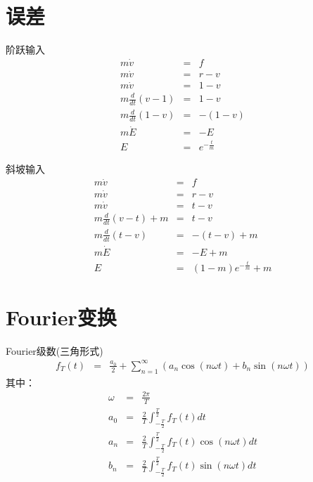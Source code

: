 \documentclass[presentation]{beamer}
\begin{document}
\section{误差}
\label{sec:orgaad6672}
\begin{frame}[label={sec:orgdc24fc9}]{阶跃输入}
\begin{eqnarray*}
 m \dot{v} & =& f\\
 m \dot{v} & =& r-v\\
 m \dot{v} & =& 1-v\\
 m \frac{d}{dt}(v-1) & =& 1-v\\
 m \frac{d}{dt}(1-v) & =& -(1-v)\\
m \dot{E} &=& -E \\
E &=& e^{-\frac{t}{m}}
\end{eqnarray*}
\end{frame}

\begin{frame}[label={sec:orgaf5f3c2}]{斜坡输入}
\begin{eqnarray*}
 m \dot{v} & =& f\\
 m \dot{v} & =& r-v\\
 m \dot{v} & =& t-v\\
 m \frac{d}{dt}(v-t) +m & =& t-v\\
 m \frac{d}{dt}(t-v) & =& -(t-v) +m\\
m \dot{E} &=& -E +m\\
E &=& (1-m)e^{-\frac{t}{m}}+m
\end{eqnarray*}
\end{frame}

\section{Fourier变换}
\label{sec:orgefb0c49}
\begin{frame}[label={sec:org259d6b1}]{Fourier级数(三角形式)}
\begin{eqnarray*}
f_T(t) & =& \frac{a_0}{2}+\sum_{n=1}^{\infty}(a_n\cos(n\omega t)+b_n\sin(n\omega t))  
\end{eqnarray*}
其中：
\begin{eqnarray*}
\omega & =& \frac{2\pi}{T}\\
a_0 &=& \frac{2}{T}\int_{-\frac{T}{2}}^{\frac{T}{2}}f_T(t)dt \\
a_n &=& \frac{2}{T}\int_{-\frac{T}{2}}^{\frac{T}{2}}f_T(t)\cos(n\omega t)dt \\
b_n &=& \frac{2}{T}\int_{-\frac{T}{2}}^{\frac{T}{2}}f_T(t)\sin(n\omega t)dt \\
\end{eqnarray*}
\end{frame}
\end{document}
